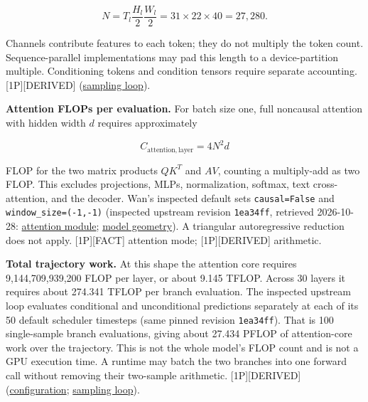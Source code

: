 \[N=T_l\frac{H_l}{2}\frac{W_l}{2}=31\times22\times40=27{,}280.\]

Channels contribute features to each token; they do not multiply the
token count. Sequence-parallel implementations may pad this length to a
device-partition multiple. Conditioning tokens and condition tensors
require separate accounting. \mbox{{[}1P{]}}\hspace{0pt}\mbox{{[}DERIVED{]}}
(\href{https://github.com/Wan-Video/Wan2.2/blob/1ea34ff48f87168174e12956e200b1d908b1c5ff/wan/textimage2video.py}{sampling
loop}).

\textbf{Attention FLOPs per evaluation.} For batch size one, full
noncausal attention with hidden width \(d\) requires approximately

\[C_{\mathrm{attention,layer}}=4N^2d\]

FLOP for the two matrix products \(QK^T\) and \(AV\), counting a
multiply-add as two FLOP. This excludes projections, MLPs,
normalization, softmax, text cross-attention, and the decoder. Wan's
inspected default sets \texttt{causal=False} and
\texttt{window\_size=(-1,-1)} (inspected upstream revision
\texttt{1ea34ff}, retrieved 2026-10-28:
\href{https://github.com/Wan-Video/Wan2.2/blob/1ea34ff48f87168174e12956e200b1d908b1c5ff/wan/modules/attention.py}{attention
module};
\href{https://github.com/Wan-Video/Wan2.2/blob/1ea34ff48f87168174e12956e200b1d908b1c5ff/wan/modules/model.py}{model
geometry}). A triangular autoregressive reduction does not apply.
\mbox{{[}1P{]}}\hspace{0pt}\mbox{{[}FACT{]}} attention mode; \mbox{{[}1P{]}}\hspace{0pt}\mbox{{[}DERIVED{]}} arithmetic.

\textbf{Total trajectory work.} At this shape the attention core
requires 9,144,709,939,200 FLOP per layer, or about 9.145 TFLOP. Across
30 layers it requires about 274.341 TFLOP per branch evaluation. The
inspected upstream loop evaluates conditional and unconditional
predictions separately at each of its 50 default scheduler timesteps
(same pinned revision \texttt{1ea34ff}). That is 100 single-sample
branch evaluations, giving about 27.434 PFLOP of attention-core work
over the trajectory. This is not the whole model's FLOP count and is not
a GPU execution time. A runtime may batch the two branches into one
forward call without removing their two-sample arithmetic.
\mbox{{[}1P{]}}\hspace{0pt}\mbox{{[}DERIVED{]}}
(\href{https://github.com/Wan-Video/Wan2.2/blob/1ea34ff48f87168174e12956e200b1d908b1c5ff/wan/configs/wan_ti2v_5B.py}{configuration};
\href{https://github.com/Wan-Video/Wan2.2/blob/1ea34ff48f87168174e12956e200b1d908b1c5ff/wan/textimage2video.py}{sampling
loop}).

